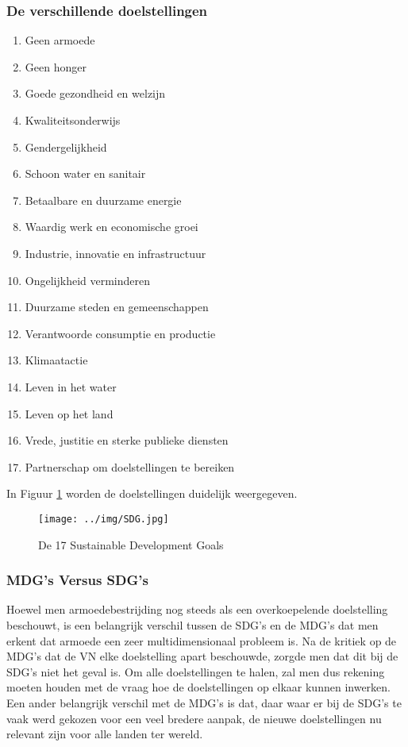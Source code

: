  \subsubsection{De verschillende doelstellingen}
 \begin{enumerate}
 	\item Geen armoede
 		\item Geen honger
 		\item Goede gezondheid en welzijn
 		\item Kwaliteitsonderwijs
 		\item Gendergelijkheid
 		\item Schoon water en sanitair
 		\item Betaalbare en duurzame energie
 		\item Waardig werk en economische groei
 		\item Industrie, innovatie en infrastructuur
 		\item Ongelijkheid verminderen
 		\item Duurzame steden en gemeenschappen
 		\item Verantwoorde consumptie en productie
 		\item Klimaatactie
 		\item Leven in het water
 		\item Leven op het land
 		\item Vrede, justitie en sterke publieke diensten
 		\item Partnerschap om doelstellingen te bereiken
 \end{enumerate}
\autocite{VerenigdeNaties2015}

In Figuur \ref{SDGs} worden de doelstellingen duidelijk weergegeven.
 
 \begin{figure}[h!]
 	\texttt{[image: ../img/SDG.jpg]}
 	\caption{De 17 Sustainable Development Goals \autocite{VerenigdeNaties2015}}
 	\label{SDGs}
 \end{figure}


\subsubsection{MDG's Versus SDG's}
Hoewel men armoedebestrijding nog steeds als een overkoepelende doelstelling beschouwt, is een belangrijk verschil tussen de SDG's en de  MDG's dat men erkent dat armoede een zeer multidimensionaal probleem is. Na de kritiek op de MDG's dat de VN elke doelstelling apart beschouwde, zorgde men dat dit bij de SDG's niet het geval is. Om alle doelstellingen te halen, zal men dus rekening moeten houden met de vraag hoe de doelstellingen op elkaar kunnen inwerken. Een ander belangrijk verschil met de MDG's is dat, daar waar er bij de SDG's te vaak werd gekozen voor een veel bredere aanpak, de nieuwe doelstellingen nu relevant zijn voor alle landen ter wereld. \autocite{VN2015}

